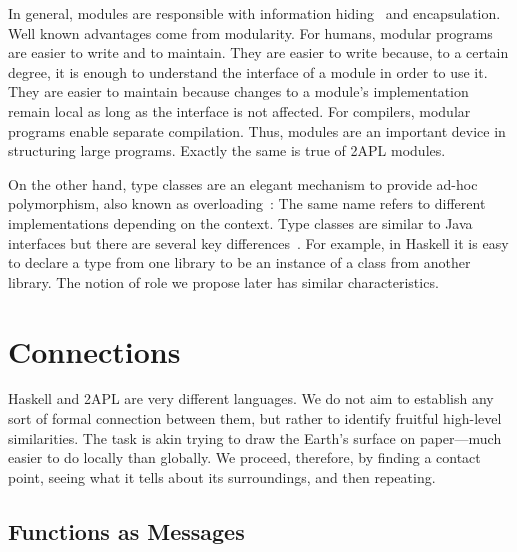 \documentclass[conference,compsoc]{IEEEtran} %
\begin{document}
In general, modules are responsible with information
hiding~\cite{DBLP:journals/cacm/Parnas72a} and encapsulation. Well known
advantages come from modularity. For humans, modular programs are easier to
write and to maintain. They are easier to write because, to a certain
degree, it is enough to understand the interface of a module in order to
use it. They are easier to maintain because changes to a module's
implementation remain local as long as the interface is not affected. For
compilers, modular programs enable separate compilation. Thus, modules are
an important device in structuring large programs. Exactly the same is true
of 2APL modules.

On the other hand, type classes are an elegant mechanism to provide ad-hoc
polymorphism, also known as overloading~\cite{DBLP:conf/popl/WadlerB89}:
The same name refers to different implementations depending on the context.
Type classes are similar to Java interfaces but there are several key
differences~\cite{WEB:PJ-tc}. For example, in Haskell it is easy to declare
a type from one library to be an instance of a class from another library.
The notion of role we propose later has similar characteristics.

\section{Connections} %

Haskell and 2APL are very different languages. We do not aim to establish
any sort of formal connection between them, but rather to identify fruitful
high-level similarities. The task is akin trying to draw the Earth's
surface on paper---much easier to do locally than globally. We proceed,
therefore, by finding a contact point, seeing what it tells about its
surroundings, and then repeating.

\subsection{Functions as Messages} %
\end{document}
